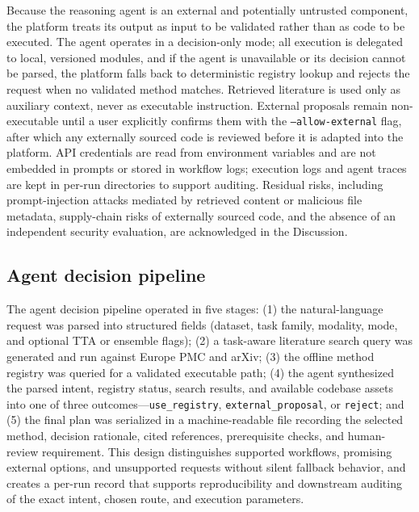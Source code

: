 \documentclass[final,5p,times,twocolumn]{elsarticle}
\begin{document}
Because the reasoning agent is an external and potentially untrusted component, the platform treats its output as input to be validated rather than as code to be executed. The agent operates in a decision-only mode; all execution is delegated to local, versioned modules, and if the agent is unavailable or its decision cannot be parsed, the platform falls back to deterministic registry lookup and rejects the request when no validated method matches. Retrieved literature is used only as auxiliary context, never as executable instruction. External proposals remain non-executable until a user explicitly confirms them with the \texttt{--allow-external} flag, after which any externally sourced code is reviewed before it is adapted into the platform. API credentials are read from environment variables and are not embedded in prompts or stored in workflow logs; execution logs and agent traces are kept in per-run directories to support auditing. Residual risks, including prompt-injection attacks mediated by retrieved content or malicious file metadata, supply-chain risks of externally sourced code, and the absence of an independent security evaluation, are acknowledged in the Discussion.

\subsection{Agent decision pipeline}
The agent decision pipeline operated in five stages: (1) the natural-language request was parsed into structured fields (dataset, task family, modality, mode, and optional TTA or ensemble flags); (2) a task-aware literature search query was generated and run against Europe PMC and arXiv; (3) the offline method registry was queried for a validated executable path; (4) the agent synthesized the parsed intent, registry status, search results, and available codebase assets into one of three outcomes---\texttt{use\_registry}, \texttt{external\_proposal}, or \texttt{reject}; and (5) the final plan was serialized in a machine-readable file recording the selected method, decision rationale, cited references, prerequisite checks, and human-review requirement. This design distinguishes supported workflows, promising external options, and unsupported requests without silent fallback behavior, and creates a per-run record that supports reproducibility and downstream auditing of the exact intent, chosen route, and execution parameters.
\end{document}

